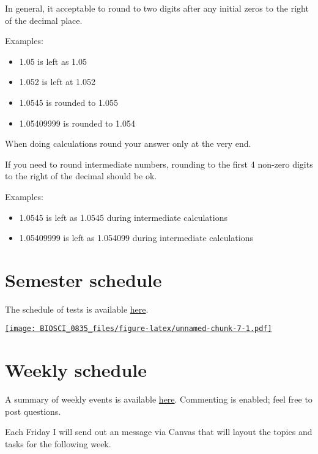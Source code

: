 \documentclass[
]{book}
\providecommand{\tightlist}{%
  \setlength{\itemsep}{0pt}\setlength{\parskip}{0pt}}
\begin{document}
In general, it acceptable to round to two digits after any initial zeros to the right of the decimal place.

Examples:

\begin{itemize}
\tightlist
\item
  1.05 is left as 1.05
\item
  1.052 is left at 1.052
\item
  1.0545 is rounded to 1.055
\item
  1.05409999 is rounded to 1.054
\end{itemize}

When doing calculations round your answer only at the very end.

If you need to round intermediate numbers, rounding to the first 4 non-zero digits to the right of the decimal should be ok.

Examples:

\begin{itemize}
\tightlist
\item
  1.0545 is left as 1.0545 during intermediate calculations
\item
  1.05409999 is left as 1.054099 during intermediate calculations
\end{itemize}

\hypertarget{semester-schedule}{%
\chapter{Semester schedule}\label{semester-schedule}}

The schedule of tests is available \href{https://docs.google.com/spreadsheets/d/1LAogpj5NgGj259ojV7maC1y64IvkHvtlDm8EGS46Ex0/edit?usp=sharing}{here}.

\href{https://docs.google.com/spreadsheets/d/1LAogpj5NgGj259ojV7maC1y64IvkHvtlDm8EGS46Ex0/edit?usp=sharing}{\texttt{[image: BIOSCI\_0835\_files/figure-latex/unnamed-chunk-7-1.pdf]}}

\hypertarget{weekly-schedule}{%
\chapter{Weekly schedule}\label{weekly-schedule}}

A summary of weekly events is available \href{https://docs.google.com/spreadsheets/d/1jxEavcRU4_lom0_x7q4YgjAeHo5lNMWX3kDjdNyVKfo/edit?usp=sharing}{here}. Commenting is enabled; feel free to post questions.

Each Friday I will send out an message via Canvas that will layout the topics and tasks for the following week.
\end{document}
